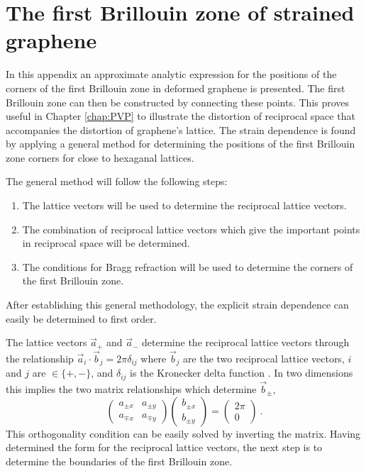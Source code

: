 \chapter{The first Brillouin zone of strained graphene \label{chap:sBZ}}

In this appendix an approximate analytic expression for the positions of the corners of the first Brillouin zone in deformed graphene is presented.
The first Brillouin zone can then be constructed by connecting these points.
This proves useful in Chapter \ref{chap:PVP} to illustrate the distortion of reciprocal space that accompanies the distortion of graphene's lattice.
The strain dependence is found by applying a general method for determining the positions of the first Brillouin zone corners for close to hexaganal lattices.

The general method will follow the following steps:
\begin{enumerate}
	\item{The lattice vectors will be used to determine the reciprocal lattice vectors.}
	\item{The combination of reciprocal lattice vectors which give the important points in reciprocal space will be determined.}
	\item{The conditions for Bragg refraction will be used to determine the corners of the first Brillouin zone.}
\end{enumerate}
After establishing this general methodology, the explicit strain dependence can easily be determined to first order.

The lattice vectors $\vec{a}_+$ and $\vec{a}_-$ determine the reciprocal lattice vectors through the relationship $\vec{a}_i \cdot \vec{b}_j=2 \pi \delta_{ij}$ where $\vec{b}_j$ are the two reciprocal lattice vectors, $i$ and $j$ are $\in \{+,-\}$, and $\delta_{ij}$ is the Kronecker delta function \cite{Kittel2005}.
In two dimensions this implies the two matrix relationships which determine $\vec{b}_{\pm}$,
\begin{equation}
	\left(\begin{array}{cc}
		a_{\pm x} & a_{\pm y} \\
		a_{\mp x} & a_{\mp y} \end{array} \right)
	\left(\begin{array}{c} 
		b_{\pm x} \\
		b_{\pm y} \end{array} \right) 
	=
	\left(\begin{array}{c} 2 \pi \\ 0 \end{array} \right) \ .
	\label{eq:sBZ:RLVs}
\end{equation}
This orthogonality condition can be easily solved by inverting the matrix.
Having determined the form for the reciprocal lattice vectors, the next step is to determine the boundaries of the first Brillouin zone.

